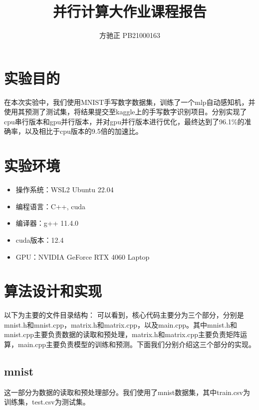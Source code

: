 \documentclass{ctexart}
\title{\textbf{并行计算大作业课程报告}}
\author{方驰正 PB21000163}
\begin{document}
\begin{sloppypar}

\maketitle




\section{实验目的}
在本次实验中，我们使用MNIST手写数字数据集，训练了一个mlp自动感知机，并使用其预测了测试集，将结果提交至kaggle上的手写数字识别项目。分别实现了cpu串行版本和gpu并行版本，并对gpu并行版本进行优化，最终达到了96.1\%的准确率，以及相比于cpu版本的9.5倍的加速比。

\section{实验环境}
\begin{itemize}
    \item 操作系统：WSL2 Ubuntu 22.04
    \item 编程语言：C++, cuda
    \item 编译器：g++ 11.4.0
    \item cuda版本：12.4
    \item GPU：NVIDIA GeForce RTX 4060 Laptop
\end{itemize}

\section{算法设计和实现}
以下为主要的文件目录结构：
可以看到，核心代码主要分为三个部分，分别是mnist.h和mnist.cpp，matrix.h和matrix.cpp，以及main.cpp。其中mnist.h和mnist.cpp主要负责数据的读取和预处理，matrix.h和matrix.cpp主要负责矩阵运算，main.cpp主要负责模型的训练和预测。下面我们分别介绍这三个部分的实现。

\subsection{mnist}
这一部分为数据的读取和预处理部分。我们使用了mnist数据集，其中train.csv为训练集，test.csv为测试集。


\end{sloppypar}
\end{document}
